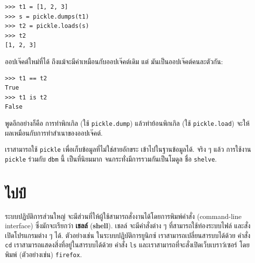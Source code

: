 \begin{verbatim}
>>> t1 = [1, 2, 3]
>>> s = pickle.dumps(t1)
>>> t2 = pickle.loads(s)
>>> t2
[1, 2, 3]
\end{verbatim}
%
%
ออปเจ๊คต์ใหม่ที่ได้ ถึงแม้จะมีค่าเหมือนกับออปเจ๊คต์เดิม
แต่ มันเป็นออปเจ๊คต์คนละตัวกัน:

\begin{verbatim}
>>> t1 == t2
True
>>> t1 is t2
False
\end{verbatim}
%
%
พูดอีกอย่างก็คือ การทำพิกเกิล (ใช้ \texttt{pickle.dump}) แล้วทำย้อนพิกเกิล (ใช้ \texttt{pickle.load}) จะให้ผลเหมือนกับการทำสำเนาของออปเจ๊คต์.


เราสามารถใช้ \texttt{pickle} เพื่อเก็บข้อมูลที่ไม่ใช่สายอักขระ เข้าไปในฐานข้อมูลได้.
จริง ๆ แล้ว การใช้งาน \texttt{pickle} ร่วมกับ \texttt{dbm} นี้ เป็นที่นิยมมาก จนกระทั่งมีการรวมกันเป็นโมดูล ชื่อ \texttt{shelve}.

\section{ไปป์}


ระบบปฏิบัติการส่วนใหญ่ จะมีส่วนที่ให้ผู้ใช้สามารถสั่งงานได้โดยการพิมพ์คำสั่ง (command-line interface) ซึ่งมักจะเรียกว่า \textbf{เชลล์} (\textbf{shell}).
เชลล์ จะมีคำสั่งต่าง ๆ ที่สามารถใช้ท่องระบบไฟล์ และสั่งเปิดโปรแกรมต่าง ๆ ได้.
ตัวอย่างเช่น ในระบบปฎิบัติการยูนิกซ์ 
เราสามารถเปลี่ยนสารบบได้ด้วย คำสั่ง \texttt{cd}
เราสามารถแสดงสิ่งที่อยู่ในสารบบได้ด้วย คำสั่ง \texttt{ls}
และเราสามารถที่จะสั่งเปิดเว็บเบราว์เซอร์ โดยพิมพ์ (ตัวอย่างเช่น) \texttt{firefox}.

